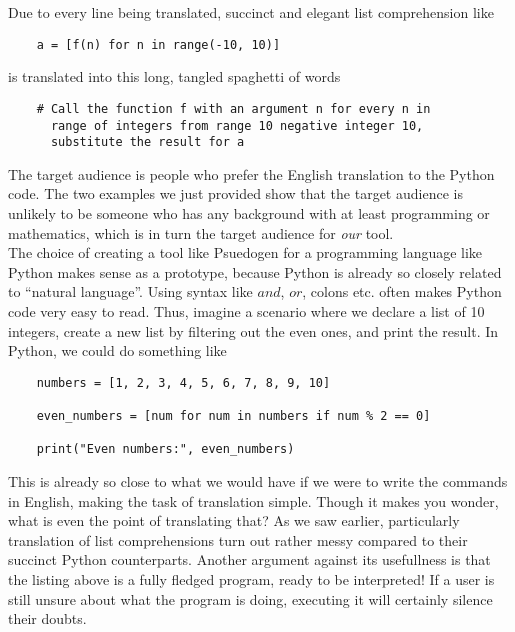 Due to every line being translated, succinct and elegant list comprehension like

\begin{verbatim}
    a = [f(n) for n in range(-10, 10)]
\end{verbatim}

is translated into this long, tangled spaghetti of words

\begin{verbatim}
    # Call the function f with an argument n for every n in
      range of integers from range 10 negative integer 10,
      substitute the result for a
\end{verbatim}

The target audience is people who prefer the English translation to the Python code. The two examples we just provided show that the target audience is unlikely to be someone who has any background with at least programming or mathematics, which is in turn the target audience for \textit{our} tool. \hfill \\

The choice of creating a tool like Psuedogen for a programming language like Python makes sense as a prototype, because Python is already so closely related to ``natural language''. Using syntax like $and$, $or$, colons etc. often makes Python code very easy to read. Thus, imagine a scenario where we declare a list of 10 integers, create a new list by filtering out the even ones, and print the result. In Python, we could do something like

\begin{verbatim}
    numbers = [1, 2, 3, 4, 5, 6, 7, 8, 9, 10]

    even_numbers = [num for num in numbers if num % 2 == 0]

    print("Even numbers:", even_numbers)
\end{verbatim}

This is already so close to what we would have if we were to write the commands in English, making the task of translation simple. Though it makes you wonder, what is even the point of translating that? As we saw earlier, particularly translation of list comprehensions turn out rather messy compared to their succinct Python counterparts. Another argument against its usefullness is that the listing above is a fully fledged program, ready to be interpreted! If a user is still unsure about what the program is doing, executing it will certainly silence their doubts. \hfill \\


